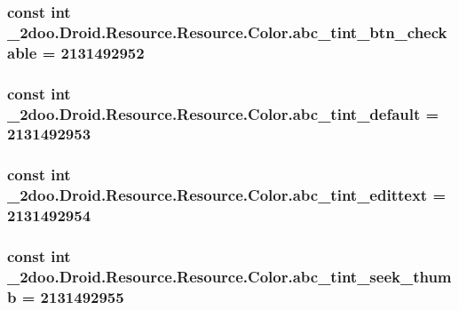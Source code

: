 \hypertarget{class__2doo_1_1_droid_1_1_resource_1_1_color_839c24e67bd7fa6cd9ff2cea784e852a}{
\subsubsection[{abc\_\-tint\_\-btn\_\-checkable}]{\setlength{\rightskip}{0pt plus 5cm}const int \_\-2doo.Droid.Resource.Resource.Color.abc\_\-tint\_\-btn\_\-checkable = 2131492952}}
\label{class__2doo_1_1_droid_1_1_resource_1_1_color_839c24e67bd7fa6cd9ff2cea784e852a}


\hypertarget{class__2doo_1_1_droid_1_1_resource_1_1_color_1f7eba9cddeb15db9384d02a07240679}{
\subsubsection[{abc\_\-tint\_\-default}]{\setlength{\rightskip}{0pt plus 5cm}const int \_\-2doo.Droid.Resource.Resource.Color.abc\_\-tint\_\-default = 2131492953}}
\label{class__2doo_1_1_droid_1_1_resource_1_1_color_1f7eba9cddeb15db9384d02a07240679}


\hypertarget{class__2doo_1_1_droid_1_1_resource_1_1_color_8e0c815e6eee4331e93b6ad299527d1d}{
\subsubsection[{abc\_\-tint\_\-edittext}]{\setlength{\rightskip}{0pt plus 5cm}const int \_\-2doo.Droid.Resource.Resource.Color.abc\_\-tint\_\-edittext = 2131492954}}
\label{class__2doo_1_1_droid_1_1_resource_1_1_color_8e0c815e6eee4331e93b6ad299527d1d}


\hypertarget{class__2doo_1_1_droid_1_1_resource_1_1_color_90b7f7dd53007ab97a32854f3f625818}{
\subsubsection[{abc\_\-tint\_\-seek\_\-thumb}]{\setlength{\rightskip}{0pt plus 5cm}const int \_\-2doo.Droid.Resource.Resource.Color.abc\_\-tint\_\-seek\_\-thumb = 2131492955}}
\label{class__2doo_1_1_droid_1_1_resource_1_1_color_90b7f7dd53007ab97a32854f3f625818}


